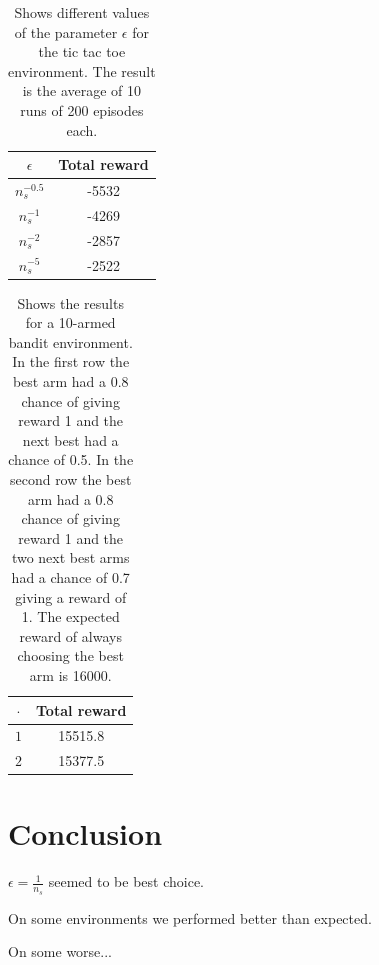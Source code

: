 \documentclass[11pt]{article}
\numberwithin{equation}{section}
\begin{document}
\begin{flushleft}
\text{ } \newline

\begin{table}[H]
\caption{Shows different values of the parameter $\epsilon$ for the tic tac toe environment. The result is the average of 10 runs of 200 episodes each.}
\begin{center}
\begin{tabular}{|c|c|}
\hline
$\epsilon$ & Total reward \\ \hline
$n_s^{-0.5}$ & -5532 \\ \hline
$n_s^{-1}$ & -4269 \\ \hline
$n_s^{-2}$ & -2857 \\ \hline
$n_s^{-5}$ & -2522 \\
\hline
\end{tabular}
\label{tab:tttMean}
\end{center}
\end{table}

\text{ } \newline

\begin{table}[H]
\caption{Shows the results for a 10-armed bandit environment. In the first row the best arm had a 0.8 chance of giving reward 1 and the next best had a chance of 0.5. In the second row the best arm had a 0.8 chance of giving reward 1 and the two next best arms had a chance of 0.7 giving a reward of 1. The expected reward of always choosing the best arm is 16000.}
\begin{center}
\begin{tabular}{|c|c|}
\hline
$\cdot$ & Total reward \\ \hline
$1$ & 15515.8 \\ \hline
$2$ & 15377.5 \\
\hline
\end{tabular}
\label{tab:UCBMean}
\end{center}
\end{table}

\newpage

\text{ } \newline

\text{ } \newline

\text{ } \newline

\section{Conclusion}

\text{ } \newline

$\epsilon = \frac{1}{n_s}$ seemed to be best choice.

\text{ } \newline

On some environments we performed better than expected.

\text{ } \newline

On some worse...

\text{ } \newline

\end{flushleft}
\end{document}
